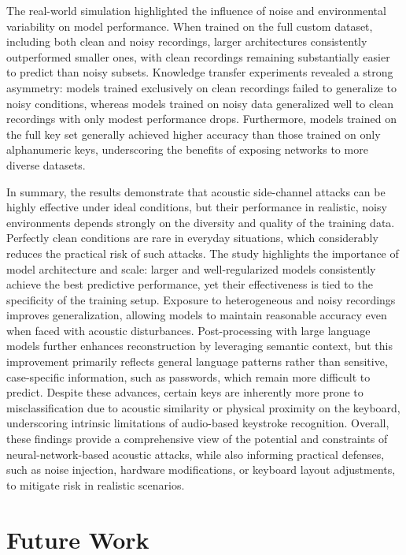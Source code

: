 \documentclass[a4paper,11pt,twoside]{report}
\theoremstyle{definition}
\begin{document}
The real-world simulation highlighted the influence of noise and environmental variability on model performance. When trained on the full custom dataset, including both clean and noisy recordings, larger architectures consistently outperformed smaller ones, with clean recordings remaining substantially easier to predict than noisy subsets. Knowledge transfer experiments revealed a strong asymmetry: models trained exclusively on clean recordings failed to generalize to noisy conditions, whereas models trained on noisy data generalized well to clean recordings with only modest performance drops. Furthermore, models trained on the full key set generally achieved higher accuracy than those trained on only alphanumeric keys, underscoring the benefits of exposing networks to more diverse datasets.

In summary, the results demonstrate that acoustic side-channel attacks can be highly effective under ideal conditions, but their performance in realistic, noisy environments depends strongly on the diversity and quality of the training data. Perfectly clean conditions are rare in everyday situations, which considerably reduces the practical risk of such attacks. The study highlights the importance of model architecture and scale: larger and well-regularized models consistently achieve the best predictive performance, yet their effectiveness is tied to the specificity of the training setup. Exposure to heterogeneous and noisy recordings improves generalization, allowing models to maintain reasonable accuracy even when faced with acoustic disturbances. Post-processing with large language models further enhances reconstruction by leveraging semantic context, but this improvement primarily reflects general language patterns rather than sensitive, case-specific information, such as passwords, which remain more difficult to predict. Despite these advances, certain keys are inherently more prone to misclassification due to acoustic similarity or physical proximity on the keyboard, underscoring intrinsic limitations of audio-based keystroke recognition. Overall, these findings provide a comprehensive view of the potential and constraints of neural-network-based acoustic attacks, while also informing practical defenses, such as noise injection, hardware modifications, or keyboard layout adjustments, to mitigate risk in realistic scenarios.

\chapter{Future Work}
\end{document}
